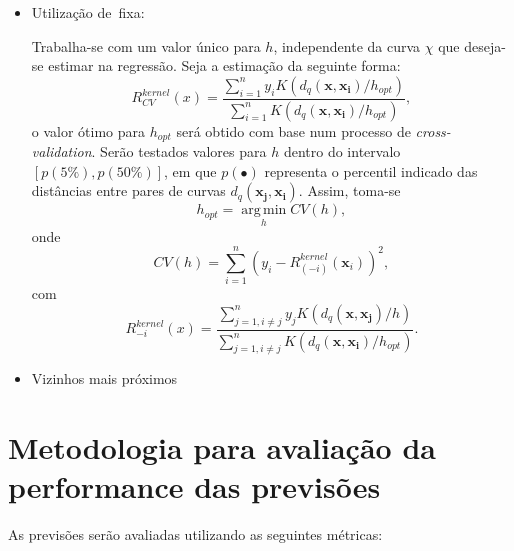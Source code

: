 \documentclass[
	12pt,				%
	openright,			%
	oneside,			%
	a4paper,			%
	english,			%
	brazil				%
	]{dissertacao-ufrgs-abntex2}
\begin{document}
\begin{itemize}

\item Utilização de \bw \,fixa:

Trabalha-se com um valor único para $h$, independente da curva $\chi$ que deseja-se estimar na regressão. Seja a estimação da seguinte forma:
\[
R_{CV}^{kernel}(x)=\dfrac{\sum_{i=1}^{n}y_{i}K(d_{q}(\boldsymbol{x},\boldsymbol{x_{i}})/h_{opt})}{\sum_{i=1}^{n}K(d_{q}(\boldsymbol{x},\boldsymbol{x_{i}})/h_{opt})},
\]
o valor ótimo para $h_{opt}$ será obtido com base num processo de \emph{cross-validation}. Serão testados valores para $h$ dentro do intervalo $[p(5\%),p(50\%)]$, em que $p(\bullet)$ representa o percentil indicado das distâncias entre pares de curvas $d_q(\boldsymbol{x_j},\boldsymbol{x_i})$. Assim, toma-se 
\[h_{opt} = \operatorname*{arg\,min}_h CV(h),\]
onde 
\[
CV(h) = \sum \limits_{i=1}^n \left(  y_i - R_{(-i)}^{kernel}(\boldsymbol{x}_i)  \right)^2, 
\]
com
\[
R_{-i}^{kernel}(x)=\dfrac{\sum \limits_{j=1,i \neq j}^{n}y_{j}K(d_{q}(\boldsymbol{x},\boldsymbol{x_{j}})/h)}{\sum \limits_{j=1,i \neq j}^{n}K(d_{q}(\boldsymbol{x},\boldsymbol{x_{i}})/h_{opt})}.
\]

\item Vizinhos mais próximos


\end{itemize}


\section{Metodologia para avaliação da performance das previsões}

As previsões serão avaliadas utilizando as seguintes métricas:
\end{document}
